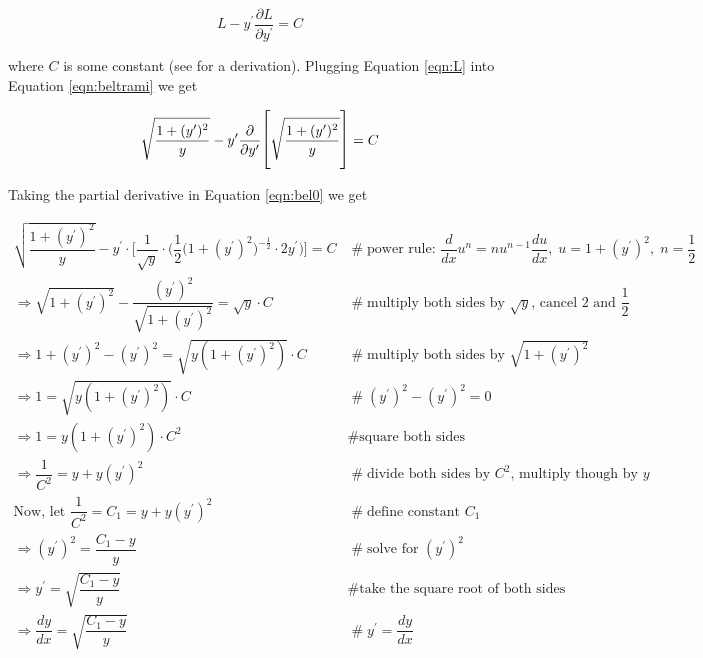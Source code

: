 \documentclass{article}
\theoremstyle{definition}
\begin{document}
\bigskip
\begin{equation}
L - y^{\prime} \dfrac{\partial L}{\partial y^{\prime}} = C
\label{eqn:beltrami}
\end{equation}

\bigskip
\noindent
where $C$ is some constant (see \cite{wiki:beltrami_identity} for a derivation). Plugging
Equation \ref{eqn:L} into Equation \ref{eqn:beltrami} we get

\bigskip
\begin{equation}
\sqrt{\dfrac{1 + (y^{\prime})^2}{y}} - y^{\prime} 
\dfrac{\partial}{\partial y^{\prime}} 
\mathlarger{\mathlarger{\Bigg [}} \sqrt{\dfrac{1 + (y^{\prime})^2}{y}} \mathlarger{\mathlarger{\Bigg ]}} 
= C
\label{eqn:bel0}
\end{equation}


\bigskip
\noindent
Taking the partial derivative in Equation \ref{eqn:bel0} we get

\medskip
\begin{equation*}
\begin{array}{lllll}
\sqrt{\dfrac{1 + (y^{\prime})^2}{y}}  - y^{\prime} \cdot 
\Bigg [
  \dfrac{1}{\sqrt{y}} \cdot
  \bigg ( 
    \dfrac{1}{2} \Big (1 + (y^{\prime})^2 \Big )^{- \frac{1}{2}} 
    \cdot 2 y^{\prime} 
  \bigg )
\Bigg ]
= C							&\mathrel{\#} \text{power rule: $\dfrac{d}{dx} u^n = n u^{n-1} \dfrac{du}{dx}, \; u= 1 + (y^{\prime})^2, \; n = \dfrac{1}{2}$} \\
[15pt]
\Rightarrow \sqrt{1 + (y^{\prime})^2} - \dfrac{(y^{\prime})^2}{\sqrt{1 + (y^{\prime})^2}} = \sqrt{y} \cdot C
							&\mathrel{\#} \text{multiply both sides by $\sqrt{y}$, cancel 2 and $\dfrac{1}{2}$} \\
[15pt]
\Rightarrow 1 + (y^{\prime})^2 -(y^{\prime})^2 = \sqrt{y (1 + (y^{\prime})^2)} \cdot C
							&\mathrel{\#} \text{multiply both sides by $\sqrt{1 + (y^{\prime})^2}$} \\
[15pt]
\Rightarrow 1 = \sqrt{y (1 + (y^{\prime})^2)} \cdot C
							&\mathrel{\#} (y^{\prime})^2 - (y^{\prime})^2 = 0 \\
[15pt]
\Rightarrow 1 = y (1 + (y^{\prime})^2) \cdot C^2
							&\mathrel{\#} \text{square both sides} \\
[15pt]
\Rightarrow \dfrac{1}{C^2} = y + y (y^{\prime})^2
							&\mathrel{\#} \text{divide both sides by $C^2$, multiply though by $y$} \\
[15pt]
\text{Now, let } \dfrac{1}{C^2} = C_1 = y + y (y^{\prime})^2
							&\mathrel{\#} \text{define constant $C_1$} \\
[15pt]
\Rightarrow (y^{\prime})^2 = \dfrac{C_1 - y}{y}
							&\mathrel{\#} \text{solve for $(y^{\prime})^2$} \\
[15pt]
\Rightarrow y^{\prime} = \sqrt{\dfrac{C_1 - y}{y}}
							&\mathrel{\#} \text{take the square root of both sides} \\
[15pt]
\Rightarrow \dfrac{dy}{dx} = \sqrt{\dfrac{C_1 - y}{y}}
							&\mathrel{\#} y^{\prime} = \dfrac{dy}{dx} \\

\end{array}
\end{equation*}
						
\end{document}

